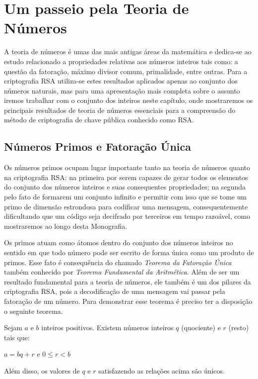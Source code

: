 
\pagestyle{fancy}
\fancyhead[R]{\thepage}
\fancyfoot[C]{}


\chapter{Um passeio pela Teoria de N\'umeros}
\label{Num}

A teoria de n\'umeros \'e umas das mais antigas \'areas da matem\'atica e dedica-se ao estudo relacionado a propriedades relativas aos n\'umeros inteiros tais como: a quest\~ao da fatora\c{c}\~ao, m\'aximo divisor comum, primalidade, entre outras. Para a criptografia RSA utiliza-se estes resultados aplicados apenas ao conjunto dos n\'umeros naturais, mas para uma apresenta\c{c}\~ao mais completa sobre o assunto iremos trabalhar com o conjunto dos inteiros neste cap\'itulo, onde mostraremos os principais resultados de teoria de n\'umeros essenciais para a compreens\~ao do m\'etodo de criptografia de chave p\'ublica conhecido como RSA.

\section{N\'umeros Primos e Fatora\c{c}\~ao \'Unica}

Os n\'umeros primos ocupam lugar importante tanto na teoria de n\'umeros quanto na criptografia RSA: na primeira por serem capazes de gerar todos os elementos do conjunto dos n\'umeros inteiros e suas consequentes propriedades; na segunda pelo fato de formarem um conjunto infinito e permitir com isso que se tome um primo de dimens\~ao estrondosa para codificar uma mensagem, consequentemente dificultando que um c\'odigo seja decifrado por terceiros em tempo razo\'avel, como mostraremos ao longo desta Monografia.

Os primos atuam como \'atomos dentro do conjunto dos n\'umeros inteiros no sentido em que todo n\'umero pode ser escrito de forma 
\'{u}nica como um produto de primos. Esse fato \'e consequ\^encia do chamado \textit{Teorema da Fatora\c{c}\~ao \'Unica} tamb\'em conhecido por \textit{Teorema Fundamental da Aritm\'etica}. Al\'em de ser um resultado fundamental para a teoria de n\'umeros, ele tamb\'em \'e um dos pilares da criptografia RSA, pois a decodifica\c{c}\~ao de uma mensagem vai passar pela fatora\c{c}\~ao de um n\'umero. Para demonstrar esse teorema \'e preciso ter a disposi\c{c}\~ao o seguinte teorema. 


\begin{Th}
\label{teo.div}
Sejam $a$ e $b$ inteiros positivos. Existem n\'umeros inteiros $q$ (quociente) e $r$ (resto) tais que:	
	\begin{center}
		$a=bq+r$ e $0\leq r <b$
	\end{center}
Al\'em disso, os valores de $q$ e $r$ satisfazendo as rela\c{c}\~oes acima s\~ao \'unicos.
\end{Th} 

